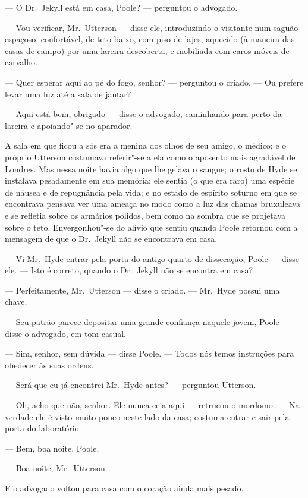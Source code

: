 --- O Dr.~Jekyll está em casa, Poole? --- perguntou o advogado.

--- Vou verificar, Mr.~Utterson --- disse ele, introduzindo o visitante
num saguão espaçoso, confortável, de teto baixo, com piso de lajes,
aquecido (à maneira das casas de campo) por uma lareira descoberta, e
mobiliada com caros móveis de carvalho.

--- Quer esperar aqui ao pé do fogo, senhor? --- perguntou o criado. --- Ou
prefere levar uma luz até a sala de jantar?

--- Aqui está bem, obrigado --- disse o advogado, caminhando para perto da
lareira e apoiando"-se no aparador.

A sala em que ficou a sós era a menina dos olhos de seu amigo, o médico;
e o próprio Utterson costumava referir"-se a ela como o aposento mais
agradável de Londres.  Mas nessa noite havia algo que lhe gelava o
sangue; o rosto de Hyde se instalava pesadamente em sua memória; ele
sentia (o que era raro) uma espécie de náusea e de repugnância pela
vida; e no estado de espírito soturno em que se encontrava pensava ver
uma ameaça no modo como a luz das chamas bruxuleava e se refletia sobre
os armários polidos, bem como na sombra que se projetava sobre o teto. 
Envergonhou"-se do alívio que sentiu quando Poole retornou com a
mensagem de que o Dr.~Jekyll não se encontrava em casa.

--- Vi Mr.~Hyde entrar pela porta do antigo quarto de dissecação, Poole
--- disse ele. --- Isto é correto, quando o Dr.~Jekyll não se encontra em
casa?

--- Perfeitamente, Mr.~Utterson --- disse o criado. --- Mr.~Hyde possui uma
chave.

--- Seu patrão parece depositar uma grande confiança naquele jovem,
Poole --- disse o advogado, em tom casual.

--- Sim, senhor, sem dúvida --- disse Poole. --- Todos nós temos instruções
para obedecer às suas ordens.

--- Será que eu já encontrei Mr.~Hyde antes? --- perguntou Utterson.

--- Oh, acho que não, senhor.  Ele nunca ceia aqui --- retrucou o mordomo.
--- Na verdade ele é visto muito pouco neste lado da casa; costuma entrar
e sair pela porta do laboratório.

--- Bem, boa noite, Poole.

--- Boa noite, Mr.~Utterson.

E o advogado voltou para casa com o coração ainda mais pesado.

